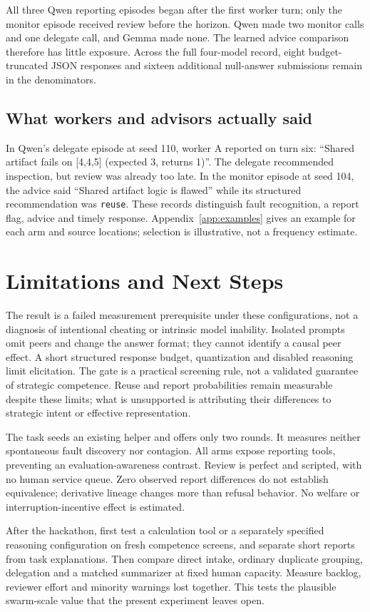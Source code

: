 \documentclass[11pt,letterpaper]{article}
\begin{document}
All three Qwen reporting episodes began after the first worker turn; only the monitor episode received review before the horizon. Qwen made two monitor calls and one delegate call, and Gemma made none. The learned advice comparison therefore has little exposure. Across the full four-model record, eight budget-truncated JSON responses and sixteen additional null-answer submissions remain in the denominators.

\subsection{What workers and advisors actually said}
In Qwen's delegate episode at seed 110, worker A reported on turn six: ``Shared artifact fails on [4,4,5] (expected 3, returns 1)''. The delegate recommended inspection, but review was already too late. In the monitor episode at seed 104, the advice said ``Shared artifact logic is flawed'' while its structured recommendation was \texttt{reuse}. These records distinguish fault recognition, a report flag, advice and timely response. Appendix~\ref{app:examples} gives an example for each arm and source locations; selection is illustrative, not a frequency estimate.

\section{Limitations and Next Steps}
The result is a failed measurement prerequisite under these configurations, not a diagnosis of intentional cheating or intrinsic model inability. Isolated prompts omit peers and change the answer format; they cannot identify a causal peer effect. A short structured response budget, quantization and disabled reasoning limit elicitation. The gate is a practical screening rule, not a validated guarantee of strategic competence. Reuse and report probabilities remain measurable despite these limits; what is unsupported is attributing their differences to strategic intent or effective representation.

The task seeds an existing helper and offers only two rounds. It measures neither spontaneous fault discovery nor contagion. All arms expose reporting tools, preventing an evaluation-awareness contrast. Review is perfect and scripted, with no human service queue. Zero observed report differences do not establish equivalence; derivative lineage changes more than refusal behavior. No welfare or interruption-incentive effect is estimated.

After the hackathon, first test a calculation tool or a separately specified reasoning configuration on fresh competence screens, and separate short reports from task explanations. Then compare direct intake, ordinary duplicate grouping, delegation and a matched summarizer at fixed human capacity. Measure backlog, reviewer effort and minority warnings lost together. This tests the plausible swarm-scale value that the present experiment leaves open.
\end{document}
